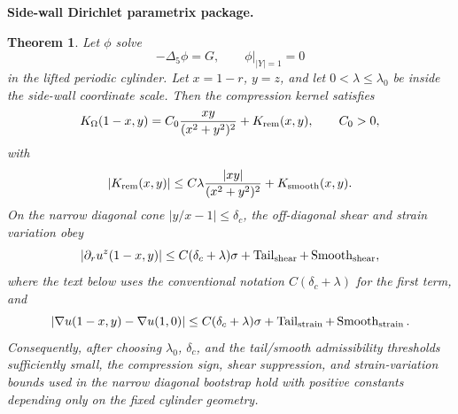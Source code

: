 \documentclass[11pt]{amsart}
\newtheorem{theorem}{Theorem}[section]
\newcommand{\Tail}{\operatorname{Tail}}
\begin{document}
\medskip
\noindent\textbf{Side-wall Dirichlet parametrix package.}
\begin{theorem}\label{thm:sidewall_parametrix_package}
Let \(\phi\) solve
\[
-\Delta_5\phi=G,
\qquad
\phi|_{|Y|=1}=0
\]
in the lifted periodic cylinder.  Let \(x=1-r\), \(y=z\), and let \(0<\lambda\le\lambda_0\) be inside the side-wall coordinate scale.  Then the compression kernel satisfies
\begin{equation}\label{eq:parametrix_compression_package}
K_\Omega(1-x,y)
=
C_0\frac{xy}{(x^2+y^2)^2}+K_{\rm rem}(x,y),
\qquad C_0>0,
\end{equation}
with
\begin{equation}\label{eq:parametrix_remainder_package}
|K_{\rm rem}(x,y)|
\le
C\lambda\frac{|xy|}{(x^2+y^2)^2}+K_{\rm smooth}(x,y).
\end{equation}
On the narrow diagonal cone \(|y/x-1|\le\delta_c\), the off-diagonal shear and strain variation obey
\begin{equation}\label{eq:parametrix_shear_package}
|\partial_r u^z(1-x,y)|
\le
C(\delta_c+\lambda)\sigma
+\Tail_{\rm shear}+\operatorname{Smooth}_{\rm shear},
\end{equation}
where the text below uses the conventional notation \(C(\delta_c+\lambda)\) for the first term, and
\begin{equation}\label{eq:parametrix_strain_package}
|\nabla u(1-x,y)-\nabla u(1,0)|
\le
C(\delta_c+\lambda)\sigma
+\Tail_{\rm strain}+\operatorname{Smooth}_{\rm strain}.
\end{equation}
Consequently, after choosing \(\lambda_0\), \(\delta_c\), and the tail/smooth admissibility thresholds sufficiently small, the compression sign, shear suppression, and strain-variation bounds used in the narrow diagonal bootstrap hold with positive constants depending only on the fixed cylinder geometry.
\end{theorem}
\end{document}
